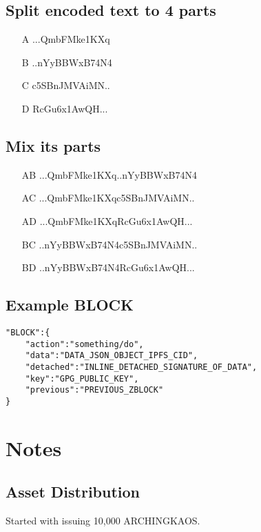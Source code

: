 \documentclass[10pt,a4paper,twocolumn]{paper}
\begin{document}
\subsection{Split encoded text to 4 parts}\label{example-split}

\begin{enumerate}
	\item[A] ...QmbFMke1KXq
	\item[B] ..nYyBBWxB74N4
	\item[C] c5SBnJMVAiMN..
	\item[D] RcGu6x1AwQH...
\end{enumerate}



\subsection{Mix its parts}\label{example-multiplex}
\begin{enumerate}
	\item[AB] ...QmbFMke1KXq..nYyBBWxB74N4
	\item[AC] ...QmbFMke1KXqc5SBnJMVAiMN.. 
	\item[AD] ...QmbFMke1KXqRcGu6x1AwQH...
	\item[BC] ..nYyBBWxB74N4c5SBnJMVAiMN..
	\item[BD] ..nYyBBWxB74N4RcGu6x1AwQH...
\end{enumerate}

\subsection{Example BLOCK}\label{example-block}
\begin{verbatim}
"BLOCK":{
    "action":"something/do",
    "data":"DATA_JSON_OBJECT_IPFS_CID",
    "detached":"INLINE_DETACHED_SIGNATURE_OF_DATA",
    "key":"GPG_PUBLIC_KEY",
    "previous":"PREVIOUS_ZBLOCK"
}
\end{verbatim}


	
\section{Notes}\label{notes}

	\subsection{Asset Distribution}\label{asset-distribution}

Started with issuing 10,000 ARCHINGKAOS.
\end{document}
